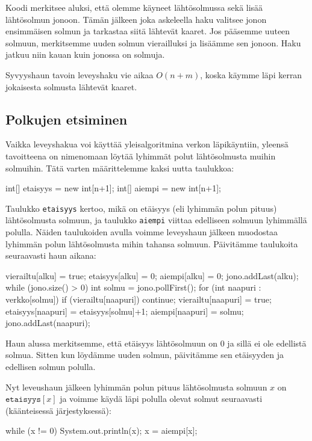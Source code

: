 Koodi merkitsee aluksi, että olemme käyneet lähtösolmussa
sekä lisää lähtösolmun jonoon.
Tämän jälkeen joka askeleella haku valitsee
jonon ensimmäisen solmun ja tarkastaa siitä lähtevät kaaret.
Jos pääsemme uuteen solmuun, merkitsemme uuden solmun
vierailluksi ja lisäämme sen jonoon.
Haku jatkuu niin kauan kuin jonossa on solmuja.

Syvyyshaun tavoin leveyshaku vie aikaa $O(n+m)$,
koska käymme läpi kerran jokaisesta solmusta lähtevät kaaret.

\subsection{Polkujen etsiminen}

Vaikka leveyshakua voi käyttää yleisalgoritmina verkon läpikäyntiin,
yleensä tavoitteena on nimenomaan löytää lyhimmät polut lähtösolmusta
muihin solmuihin. Tätä varten määrittelemme kaksi uutta taulukkoa:

\begin{code}
int[] etaisyys = new int[n+1];
int[] aiempi = new int[n+1];
\end{code}

Taulukko \texttt{etaisyys} kertoo, mikä on etäisyys
(eli lyhimmän polun pituus) lähtösolmusta solmuun,
ja taulukko \texttt{aiempi} viittaa edelliseen solmuun lyhimmällä polulla.
Näiden taulukoiden avulla voimme leveyshaun jälkeen muodostaa
lyhimmän polun lähtösolmusta mihin tahansa solmuun.
Päivitäm\-me taulukoita seuraavasti haun aikana:

\begin{code}
vierailtu[alku] = true;
etaisyys[alku] = 0;
aiempi[alku] = 0;
jono.addLast(alku);
while (jono.size() > 0) {
    int solmu = jono.pollFirst();
    for (int naapuri : verkko[solmu]) {
        if (vierailtu[naapuri]) continue;
        vierailtu[naapuri] = true;
        etaisyys[naapuri] = etaisyys[solmu]+1;
        aiempi[naapuri] = solmu;
        jono.addLast(naapuri);
    }
}
\end{code}

Haun alussa merkitsemme, että etäisyys lähtösolmuun on 0
ja sillä ei ole edellistä solmua.
Sitten kun löydämme uuden solmun, päivitämme sen etäisyyden
ja edellisen solmun polulla.

Nyt leveushaun jälkeen lyhimmän polun pituus lähtösolmusta
solmuun $x$ on $\texttt{etaisyys}[x]$ ja voimme käydä läpi polulla
olevat solmut seuraavasti (käänteisessä järjestyksessä):

\begin{code}
while (x != 0) {
    System.out.println(x);
    x = aiempi[x];
}
\end{code}

